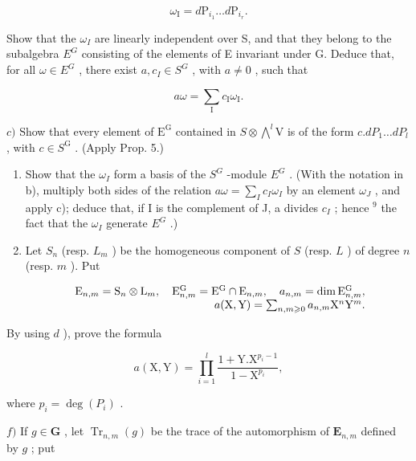 \[
\omega_ {\mathrm{I}} = d \mathrm{P} _ {i _ {1}} \dots d \mathrm{P} _ {i _ {r}}.
\]

Show that the \(\omega_{I}\) are linearly independent over S, and that they belong to the subalgebra \(E^{G}\) consisting of the elements of E invariant under G. Deduce that, for all \(\omega \in E^{G}\) , there exist \(a, c_{I} \in S^{G}\) , with \(a \neq 0\) , such that

\[
a \omega = \sum_ {\mathrm{I}} c _ {\mathrm{I}} \omega_ {\mathrm{I}}.
\]

\(c)\) Show that every element of \(\mathrm{E}^{\mathrm{G}}\) contained in \(S\otimes \bigwedge^{l}\mathrm{V}\) is of the form \(c.dP_{1}\ldots dP_{l}\) , with \(c\in S^{\mathrm{G}}\) . (Apply Prop. 5.)

\begin{enumerate}
\def\labelenumi{\alph{enumi})}
\setcounter{enumi}{3}
\item
  Show that the \(\omega_{I}\) form a basis of the \(S^{G}\) -module \(E^{G}\) . (With the notation in b), multiply both sides of the relation \(a\omega = \sum_{I} c_{I}\omega_{I}\) by an element \(\omega_{J}\) , and apply c); deduce that, if I is the complement of J, a divides \(c_{I}\) ; hence \(^{9}\) the fact that the \(\omega_{I}\) generate \(E^{G}\) .)
\item
  Let \(S_{n}\) (resp. \(L_{m}\) ) be the homogeneous component of \(S\) (resp. \(L\) ) of degree \(n\) (resp. \(m\) ). Put
\end{enumerate}

\[
\begin{array}{r l r} & & {\mathrm{E} _ {n, m} = \mathrm{S} _ {n} \otimes \mathrm{L} _ {m}, \quad \mathrm{E} _ {n, m} ^ {\mathrm{G}} = \mathrm{E} ^ {\mathrm{G}} \cap \mathrm{E} _ {n, m}, \quad a _ {n, m} = \dim \mathrm{E} _ {n, m} ^ {\mathrm{G}},} \\ & & {a (\mathrm{X}, \mathrm{Y}) = \sum_ {n, m \geqslant 0} a _ {n, m} \mathrm{X} ^ {n} \mathrm{Y} ^ {m}.} \end{array}
\]

By using \(d\) ), prove the formula

\[
a (\mathrm{X}, \mathrm{Y}) = \prod_ {i = 1} ^ {l} \frac {1 + \mathrm{Y} . \mathrm{X} ^ {p _ {i} - 1}}{1 - \mathrm{X} ^ {p _ {i}}},
\]

where \(p_{i} = \deg(P_{i})\) .

\(f)\) If \(g \in \mathbf{G}\) , let \(\operatorname{Tr}_{n,m}(g)\) be the trace of the automorphism of \(\mathbf{E}_{n,m}\) defined by \(g\) ; put

